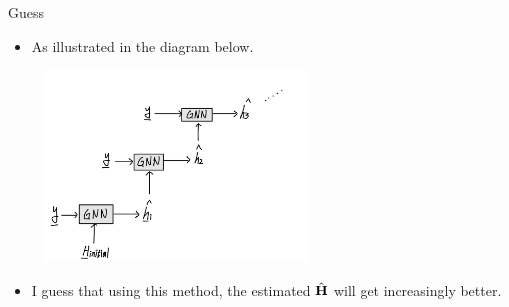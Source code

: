 \documentclass[hyperref={bookmarks=false}]{beamer}
\numberwithin{figure}{section}
\begin{document}
\begin{frame}{Guess}
\begin{itemize}
    \item As illustrated in the diagram below.
\end{itemize}
\centering
\includegraphics[width=3.5in,height=2.0in]{figures/Guess.jpg}
\begin{itemize}
    \item I guess that using this method, the estimated $\hat{{\bf H}}$ will get increasingly better.
\end{itemize}
\end{frame}
\end{document}
